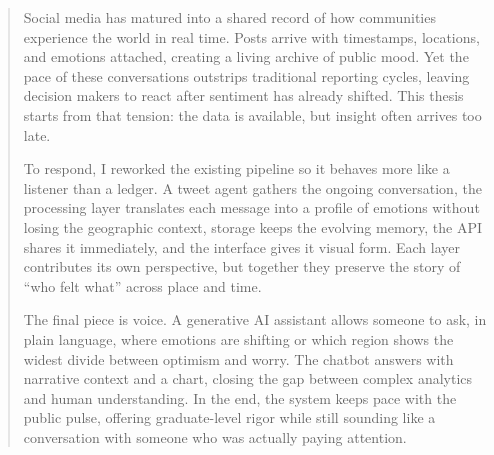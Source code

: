 \documentclass[
12pt,
english,
onehalfspacing,
headsepline,
draft,  %
]{MastersDoctoralThesis}
\begin{document}
\begin{singlespacing}

\begin{abstract}
\addchaptertocentry{\abstractname}

Social media has matured into a shared record of how communities experience the world in real time. Posts arrive with timestamps, locations, and emotions attached, creating a living archive of public mood. Yet the pace of these conversations outstrips traditional reporting cycles, leaving decision makers to react after sentiment has already shifted. This thesis starts from that tension: the data is available, but insight often arrives too late.

To respond, I reworked the existing pipeline so it behaves more like a listener than a ledger. A tweet agent gathers the ongoing conversation, the processing layer translates each message into a profile of emotions without losing the geographic context, storage keeps the evolving memory, the API shares it immediately, and the interface gives it visual form. Each layer contributes its own perspective, but together they preserve the story of ``who felt what'' across place and time.

The final piece is voice. A generative AI assistant allows someone to ask, in plain language, where emotions are shifting or which region shows the widest divide between optimism and worry. The chatbot answers with narrative context and a chart, closing the gap between complex analytics and human understanding. In the end, the system keeps pace with the public pulse, offering graduate-level rigor while still sounding like a conversation with someone who was actually paying attention.

\end{abstract}

\end{singlespacing}


\tableofcontents

\listoffigures


\mainmatter
\end{document}
